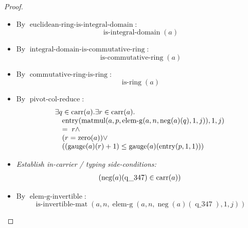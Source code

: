 \documentclass[11pt]{article}
\theoremstyle{plain}
\begin{document}
\begin{proof}
\begin{itemize}[leftmargin=2.8em, itemsep=4pt, parsep=1pt]
  \item[\textbf{11}] By $\operatorname{euclidean\text{-}ring\text{-}is\text{-}integral\text{-}domain}$:
\begin{equation*}
\operatorname{is\text{-}integral\text{-}domain}(a)
\end{equation*}

  \item[\textbf{12}] By $\operatorname{integral\text{-}domain\text{-}is\text{-}commutative\text{-}ring}$:
\begin{equation*}
\operatorname{is\text{-}commutative\text{-}ring}(a)
\end{equation*}

  \item[\textbf{13}] By $\operatorname{commutative\text{-}ring\text{-}is\text{-}ring}$:
\begin{equation*}
\operatorname{is\text{-}ring}(a)
\end{equation*}

  \item[\textbf{14}] By $\operatorname{pivot\text{-}col\text{-}reduce}$:
\begin{equation*}
\begin{array}{@{}l@{}} \exists q \in \operatorname{carr}(a). \exists r \in \operatorname{carr}(a). \\ \quad \operatorname{entry}(\operatorname{matmul}(a, p, \operatorname{elem\text{-}g}(a, n, \operatorname{neg}(a)(q), 1, j)), 1, j) \\ \quad =\; r \wedge \\ \quad (r = \operatorname{zero}(a)) \vee \\ \quad ((\operatorname{gauge}(a)(r) + 1) \leq \operatorname{gauge}(a)(\operatorname{entry}(p, 1, 1))) \end{array}
\end{equation*}

  \item[\textbf{15--20}] \emph{Establish in-carrier / typing side-conditions:}
\begin{equation*}
\begin{array}{@{}l@{}}
(\operatorname{neg}(a)(\operatorname{q\_347}) \in \operatorname{carr}(a))
\end{array}
\end{equation*}

  \item[\textbf{21}] By $\operatorname{elem\text{-}g\text{-}invertible}$:
\begin{equation*}
\operatorname{is\text{-}invertible\text{-}mat}(a, n, \operatorname{elem\text{-}g}(a, n, \operatorname{neg}(a)(\operatorname{q\_347}), 1, j))
\end{equation*}


\end{itemize}
\end{proof}
\end{document}

